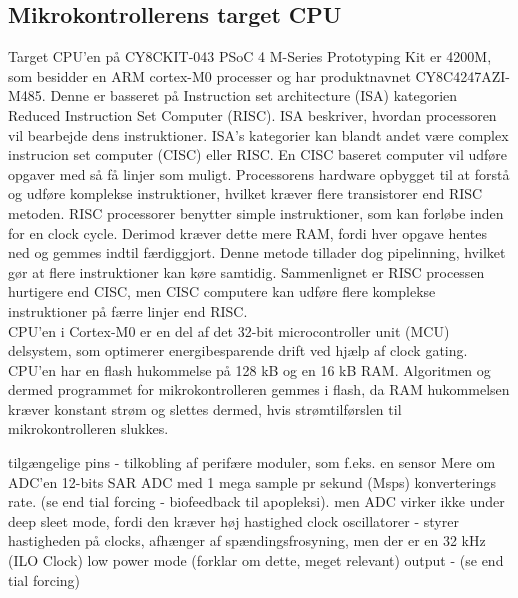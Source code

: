 \subsection{Mikrokontrollerens target CPU}
Target CPU'en på CY8CKIT-043 PSoC 4 M-Series Prototyping Kit er 4200M, som besidder en ARM cortex-M0 processer og har produktnavnet CY8C4247AZI-M485. Denne er basseret på Instruction set architecture (ISA) kategorien Reduced Instruction Set Computer (RISC). ISA beskriver, hvordan processoren vil bearbejde dens instruktioner. ISA's kategorier kan blandt andet være complex instrucion set computer (CISC) eller RISC. En CISC baseret computer vil udføre opgaver med så få linjer som muligt. Processorens hardware opbygget til at forstå og udføre komplekse instruktioner, hvilket kræver flere transistorer end RISC metoden. RISC processorer benytter simple instruktioner, som kan forløbe inden for en clock cycle. Derimod kræver dette mere RAM, fordi hver opgave hentes ned og gemmes indtil færdiggjort. Denne metode tillader dog pipelinning, hvilket gør at flere instruktioner kan køre samtidig. Sammenlignet er RISC processen hurtigere end CISC, men CISC computere kan udføre flere komplekse instruktioner på færre linjer end RISC. \citep{CYPRESS2016Cortexm0,Semiconductor20164200M,Yadav2016}\\
CPU'en i Cortex-M0 er en del af det 32-bit microcontroller unit (MCU) delsystem, som optimerer energibesparende drift ved hjælp af clock gating. %
CPU'en har en flash hukommelse på 128 kB og en 16 kB RAM. Algoritmen og dermed programmet for mikrokontrolleren gemmes i flash, da RAM hukommelsen kræver konstant strøm og slettes dermed, hvis strømtilførslen til mikrokontrolleren slukkes. \citep{Semiconductor20164200M}

tilgængelige pins - tilkobling af perifære moduler, som f.eks. en sensor
Mere om ADC'en 12-bits SAR ADC med 1 mega sample pr sekund (Msps) konverterings rate. (se end tial forcing - biofeedback til apopleksi). men ADC virker ikke under deep sleet mode, fordi den kræver høj hastighed clock
oscillatorer - styrer hastigheden på clocks, afhænger af spændingsfrosyning, men der er en 32 kHz (ILO Clock) low power mode (forklar om dette, meget relevant)
output - (se end tial forcing)


